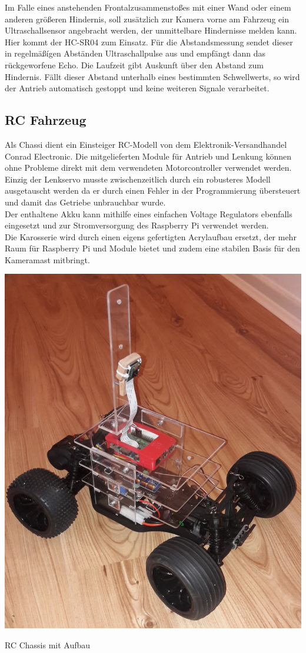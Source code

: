     \vspace{1cm}
    Im Falle eines anstehenden Frontalzusammenstoßes mit einer Wand oder einem
    anderen größeren Hindernis, soll zusätzlich zur Kamera vorne am Fahrzeug ein
    Ultraschallsensor angebracht werden, der unmittelbare Hindernisse melden
    kann. Hier kommt der HC-SR04 zum Einsatz. Für die Abstandsmessung sendet
    dieser in regelmäßígen Abständen Ultraschallpulse aus und empfängt dann das
    rückgeworfene Echo. Die Laufzeit gibt Auskunft über den Abstand zum
    Hindernis. Fällt dieser Abstand unterhalb eines bestimmten Schwellwerts, so
    wird der Antrieb automatisch gestoppt und keine weiteren Signale
    verarbeitet.

  \subsection{RC Fahrzeug}

    Als Chassi dient ein Einsteiger RC-Modell von dem Elektronik-Versandhandel
    Conrad Electronic. Die mitgelieferten Module für Antrieb und Lenkung können
    ohne Probleme direkt mit dem verwendeten Motorcontroller verwendet werden.
    Einzig der Lenkservo musste zwischenzeitlich durch ein robusteres Modell 
    ausgetauscht werden da er durch einen Fehler in der Programmierung
    übersteuert und damit das Getriebe unbrauchbar wurde. \\
    Der enthaltene Akku kann mithilfe eines einfachen Voltage Regulators
    ebenfalls eingesetzt und zur Stromversorgung des Raspberry Pi verwendet
    werden. \\
    Die Karosserie wird durch einen eigens gefertigten Acrylaufbau ersetzt, der
    mehr Raum für Raspberry Pi und Module bietet und zudem eine stabilen Basis
    für den Kameramast mitbringt.
    \ \\
    \begin{minipage}{\columnwidth}
      \makeatletter
      \def\@captype{figure}
      \makeatother
      \centering
      \includegraphics[width=0.6\linewidth]{images/hw_setup.jpg}
      \caption{RC Chassis mit Aufbau}
      \label{fig:img-hw-05}
    \end{minipage}
    \vspace{1cm}

